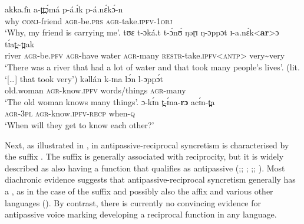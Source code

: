 \ea {} \citep[505, 573, 558, 742]{smits:2017}
\ea\label{ex:Lumun:take:a}
	\gll	akka.ɪ̂n a-t̪t̪ɔ́má p-á.ɪ́k p-á.nɛ́kɔ́-n \\
			why \textsc{conj}-friend \textsc{agr}-be.\textsc{prs} \textsc{agr}-take.\textsc{ipfv-1obj} \\
	\glt	‘Why, my friend is carrying me’.
\ex\label{ex:Lumun:take:b}
	\gll	tʊɛ t-ɔká.t t-ɔ́nʊ́ ŋəɽɪ ŋ-ɔppɔt ɪ-a.nɛ́k<\textbf{ar}>ɔ tɪ́at̪\~{}t̪ɪak \\
			river \textsc{agr}-be.\textsc{pfv} \textsc{agr}-have water \textsc{agr}-many \textsc{restr}-take.\textsc{ipfv<antp>} very\~{}very \\
	\glt	‘There was a river that had a lot of water and that took many people’s lives’. (lit. ‘[…] that took very’)
\ex\label{ex:Lumun:know:a}
	\gll	kəllán k-ɪna lɔ́n l-ɔppɔ́t \\
			old.woman \textsc{agr}-know.\textsc{ipfv} words/things \textsc{agr}-many \\
	\glt	‘The old woman knows many things’.
\ex\label{ex:Lumun:know:b}
	\gll	ɔ-kɪ́n t̪-ɪ́na-\textbf{rɔ} acɪ́n-t̪a \\
			\textsc{agr-3pl} \textsc{agr}-know.\textsc{ipfv-recp} when-\textsc{q} \\
	\glt	‘When will they get to know each other?’
	\z 
\z

Next, as illustrated in , in  antipassive-reciprocal syncretism is characterised by the suffix . The suffix is generally associated with reciprocity, but it is widely described as also having a function that qualifies as antipassive (\citealt[192f.]{zinnatullina:1969};; \citeyear[179]{zinnatullina:1993}; \citealt[297f.]{nedjalkov:2007d};; \citealt[490]{burbiel:2018}). Most diachronic evidence suggests that antipassive-reciprocal syncretism generally has a , as in the case of the  suffix  and possibly also the  affix  and various other languages (). By contrast, there is currently no convincing evidence for antipassive voice marking developing a reciprocal function in any language.

